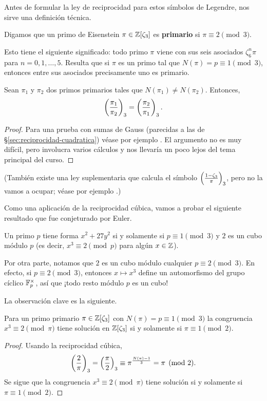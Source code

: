 Antes de formular la ley de reciprocidad para estos símbolos de Legendre,
nos sirve una definición técnica.

\begin{definicion}
  Digamos que un primo de Eisenstein $\pi \in \mathbb{Z} [\zeta_3]$ es
  \textbf{primario} si $\pi \equiv 2 \pmod{3}$.
\end{definicion}

Esto tiene el siguiente significado: todo primo $\pi$ viene con sus seis
asociados $\zeta_6^n \pi$ para $n = 0,1,\ldots,5$. Resulta que si $\pi$ es un
primo tal que $N (\pi) = p \equiv 1 \pmod{3}$, entonces entre sus asociados
precisamente uno es primario.

\begin{teorema}
  Sean $\pi_1$ y $\pi_2$ dos primos primarios tales que
  $N (\pi_1) \ne N (\pi_2)$. Entonces,
  $$\left(\frac{\pi_1}{\pi_2}\right)_3 = \left(\frac{\pi_2}{\pi_1}\right)_3.$$

  \begin{proof}
    Para una prueba con sumas de Gauss (parecidas a las de
    \S\ref{sec:reciprocidad-cuadratica}) véase por ejemplo
    \cite[Chapter~9]{Ireland-Rosen}. El argumento no es muy difícil,
    pero involucra varios cálculos y nos llevaría un poco lejos del tema
    principal del curso.
  \end{proof}
\end{teorema}
(También existe una ley suplementaria que calcula el símbolo
$\left(\frac{1-\zeta_3}{\pi}\right)_3$, pero no la vamos a ocupar;
véase por ejemplo \cite{Williams-1977}.)

Como una aplicación de la reciprocidad cúbica, vamos a probar el siguiente
resultado que fue conjeturado por Euler.

\begin{teorema}
  Un primo $p$ tiene forma $x^2 + 27 y^2$ si y solamente si
  $p \equiv 1 \pmod{3}$ y $2$ es un cubo módulo $p$
  (es decir, $x^3 \equiv 2 \pmod{p}$ para algún $x \in \mathbb{Z}$).
\end{teorema}

Por otra parte, notamos que $2$ es un cubo módulo cualquier
$p \equiv 2\pmod{3}$. En efecto, si $p \equiv 2\pmod{3}$, entonces
$x \mapsto x^3$ define un automorfismo del grupo cíclico $\mathbb{F}_p^\times$,
así que ¡todo resto módulo $p$ es un cubo!


La observación clave es la siguiente.

\begin{lema}
  Para un primo primario $\pi \in \mathbb{Z} [\zeta_3]$ con
  $N (\pi) = p \equiv 1 \pmod{3}$ la congruencia $x^3 \equiv 2 \pmod{\pi}$ tiene
  solución en $\mathbb{Z} [\zeta_3]$ si y solamente si $\pi \equiv 1 \pmod{2}$.

  \begin{proof}
    Usando la reciprocidad cúbica,
    \[ \left(\frac{2}{\pi}\right)_3 = \left(\frac{\pi}{2}\right)_3 \equiv \pi^{\frac{N(\pi) - 1}{3}}
           = \pi \pmod{2}. \]
    Se sigue que la congruencia $x^3 \equiv 2 \pmod{\pi}$
    tiene solución si y solamente si $\pi \equiv 1 \pmod{2}$.
  \end{proof}
\end{lema}

